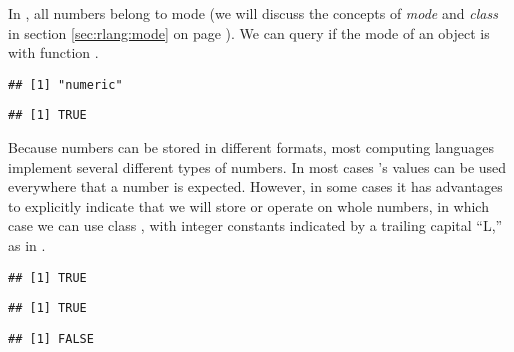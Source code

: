 \documentclass[krantz2]{krantz}\usepackage{knitr}
\begin{document}
\begin{explainbox}\label{box:integer:float}
In \Rlang, all numbers belong to mode  (we will discuss the concepts of \emph{mode} and \emph{class} in section \ref{sec:rlang:mode} on page \pageref{sec:rlang:mode}). We can query if the mode of an object is  with function .

\begin{knitrout}\footnotesize
{}\color{fgcolor}\begin{kframe}
\begin{alltt}
\hlstd{(}\hlstd{)}
\end{alltt}
\begin{verbatim}
## [1] "numeric"
\end{verbatim}
\begin{alltt}
 \hlkwb{<-} 
\end{alltt}
\begin{verbatim}
## [1] TRUE
\end{verbatim}
\end{kframe}
\end{knitrout}

Because numbers can be stored in different formats, most computing languages implement several different types of numbers. In most cases \Rpgrm's  values can be used everywhere that a number is expected. However, in some cases it has advantages to explicitly indicate that we will store or operate on whole numbers, in which case we can use class , with integer constants indicated by a trailing capital ``L,'' as in  .

\begin{knitrout}\footnotesize
{}\color{fgcolor}\begin{kframe}
\begin{alltt}
\hlstd{(}\hlstd{)}
\end{alltt}
\begin{verbatim}
## [1] TRUE
\end{verbatim}
\begin{alltt}
\hlstd{(}\hlstd{)}
\end{alltt}
\begin{verbatim}
## [1] TRUE
\end{verbatim}
\begin{alltt}
\hlstd{(}\hlstd{)}
\end{alltt}
\begin{verbatim}
## [1] FALSE
\end{verbatim}
\end{kframe}
\end{knitrout}


\end{explainbox}
\end{document}
